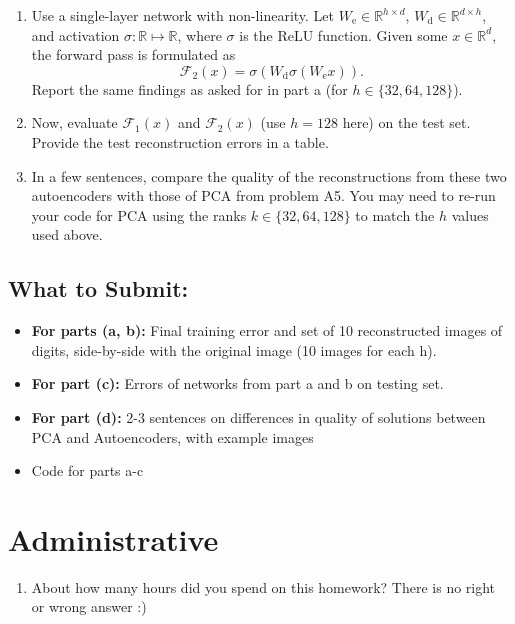 \documentclass{article}
\begin{document}
\begin{aprob}
\begin{enumerate}
  \item {} Use a single-layer network with non-linearity. Let $W_{\text{e}} \in \mathbb{R}^{h \times d}$, $W_{\text{d}} \in \mathbb{R}^{d\times h}$, and activation $\sigma: \mathbb{R} \longmapsto \mathbb{R}$, where $\sigma$ is the ReLU function. Given some $x \in \mathbb{R}^d$,
    the forward pass is formulated as 
    \[
      \mathcal{F}_{2}(x) = \sigma(W_{\text{d}} \sigma(W_{\text{e}} x))
    .\] Report the same findings as asked for in part a (for $h \in \{ 32,64,128 \}$).
  \item {} Now, evaluate $\mathcal{F}_1(x)$ and $\mathcal{F}_2(x)$ (use $h=128$
    here) on the test set. Provide the test reconstruction errors in a
    table.
  \item {} In a few sentences, compare the quality of the reconstructions from these two autoencoders with those of PCA from problem A5. You may need to re-run your code for PCA using the ranks $k \in \{32, 64, 128\}$ to match the $h$ values used above.
\end{enumerate}
 \subsection*{What to Submit:}
    \begin{itemize}

        \item \textbf{For parts (a, b):} Final training error and set of 10 reconstructed images of digits, side-by-side with the
original image (10 images for each h).
        \item \textbf{For part (c):} Errors of networks from part a and b on testing set.
        \item \textbf{For part (d):} 2-3 sentences on differences in quality of solutions between PCA and Autoencoders, with
example images
        \item Code for parts a-c
    \end{itemize}

\end{aprob}

\section*{Administrative}
\begin{aprob}
\begin{enumerate}
    \item {} About how many hours did you spend on this homework? There is no right or wrong answer :)
\end{enumerate}
\end{aprob}
\end{document}
